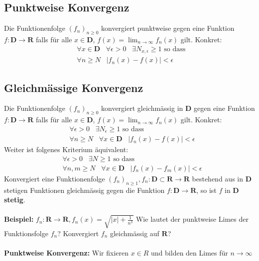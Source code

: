 \documentclass[8pt]{extarticle}
\begin{document}
\begin{multicols*}{3}
 \subsection{Punktweise Konvergenz}
Die Funktionenfolge $(f_n)_{n \geq 0}$ konvergiert punktweise gegen eine Funktion
$f:\mathbf{D} \rightarrow \mathbf{R}$ falls für alle $x \in \mathbf{D}$, $f(x) = \lim_{n \rightarrow \infty} f_n(x)$ gilt. Konkret:
\begin{align*}
  &\forall x \in \mathbf{D} \;\;\; \forall \epsilon > 0 \;\;\; \exists N_{x, \epsilon} \geq 1 \text{ so dass }\\
  &\forall n \geq N \;\;\; |f_n(x) - f(x)| < \epsilon
\end{align*}
\subsection{Gleichmässige Konvergenz}
 Die Funktionenfolge $(f_n)_{n \geq 0}$ konvergiert gleichmässig in $\mathbf{D}$ gegen eine Funktion
$f:\mathbf{D} \rightarrow \mathbf{R}$ falls für alle $x \in \mathbf{D}$, $f(x) = \lim_{n \rightarrow \infty} f_n(x)$ gilt. Konkret:
\begin{align*}
  &\forall \epsilon > 0 \;\;\; \exists N_{\epsilon} \geq 1 \text{ so dass }\\
  &\forall n \geq N \;\;\;\forall x \in \mathbf{D} \;\;\; |f_n(x) - f(x)| < \epsilon
\end{align*}
Weiter ist folgenes Kriterium äquivalent:
\begin{align*}
  &\forall \epsilon > 0 \;\;\; \exists N \geq 1 \text{ so dass }\\
  &\forall n, m \geq N \;\;\;\forall x \in \mathbf{D} \;\;\; |f_n(x) - f_m(x)| < \epsilon
\end{align*}
Konvergiert eine Funktionenfolge $(f_n)_{n \geq 1}, f_n:\mathbf{D} \subset \mathbf{R} \rightarrow \mathbf{R}$
bestehend aus in $\mathbf{D}$ stetigen Funktionen gleichmässig gegen die Funktion $f:\mathbf{D} \rightarrow \mathbf{R}$, so
ist $f$ in $\mathbf{D}$ \textbf{stetig}.\\
\\
\textbf{Beispiel:}
$f_n : \mathbf{R} \rightarrow \mathbf{R}, f_n(x) = \sqrt{|x| + \frac{1}{n^3}}$
Wie lautet der punktweise Limes der Funktionsfolge $f_n$? Konvergiert $f_n$ gleichmässig auf  $\mathbf{R}$?\\ 
\\
\textbf{Punktweise Konvergenz:} Wir fixieren $x \in R$ und bilden den Limes für $n \rightarrow \infty$

\end{multicols*}
\end{document}
